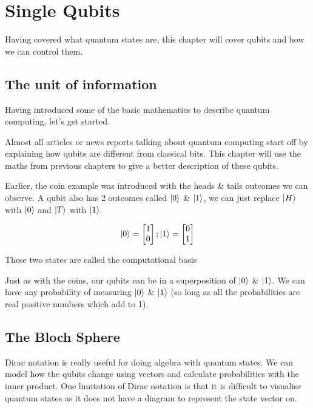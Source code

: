 \documentclass{book}
\begin{document}
\chapter{Single Qubits}

Having covered what quantum states are, this chapter will cover qubits and how we can control them. 

\section{ The unit of information}

Having introduced some of the basic mathematics to describe quantum computing, let's get started. 

Almost all articles or news reports talking about quantum computing start off by explaining how qubits are different from classical bits. This chapter will use the maths from previous chapters to give a better description of these qubits. 

Earlier, the coin example was introduced with the heads \& tails outcomes we can observe. A qubit also has 2 outcomes called $\ket{0}$ \& $\ket{1}$, we can just replace $\ket{H}$ with $\ket{0}$ and $\ket{T}$ with $\ket{1}$. 

$$
\ket{0} = \begin{bmatrix} 1 \\ 0 \end{bmatrix} ; \ket{1} = \begin{bmatrix} 0 \\ 1 \end{bmatrix} 
$$

These two states are called the computational basis

Just as with the coins, our qubits can be in a superposition of $\ket{0}$ \& $\ket{1}$. We can have any probability of measuring $\ket{0}$ \& $\ket{1}$ (so long as all the probabilities are real positive numbers which add to 1). 

\section{ The Bloch Sphere }

Dirac notation is really useful for doing algebra with quantum states. We can model how the qubits change using vectors and calculate probabilities with the inner product. One limitation of Dirac notation is that it is difficult to visualise quantum states as it does not have a diagram to represent the state vector on. 
\end{document}
